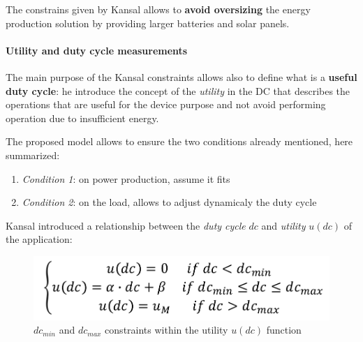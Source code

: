 \documentclass[10pt,a4paper]{report}
\theoremstyle{definition}
\begin{document}
The constrains given by Kansal allows to \textbf{avoid oversizing} the energy production solution by providing larger batteries and solar panels.
\paragraph{Utility and duty cycle measurements}\label{sec:utility-and-duty-cycle-measurements}
The main purpose of the Kansal constraints allows also to define what is a \textbf{useful duty cycle}: he introduce the concept of the \textit{utility} in the DC that describes the operations that are useful for the device purpose and not avoid performing operation due to insufficient energy.

The proposed model allows to ensure the two conditions already mentioned, here summarized:
\begin{enumerate}
	\item 
	\textit{Condition 1}: on power production, assume it fits
	\item 
	\textit{Condition 2}: on the load, allows to adjust dynamicaly the duty cycle
\end{enumerate}

Kansal introduced a relationship between the \textit{duty cycle} $dc$ and \textit{utility} $u(dc)$ of the application:
\begin{figure}[h]
	\centering\includegraphics[scale=0.30]{images/Pasted image 20230509154741.png}
	\caption{$dc_{min}$ and $dc_{max}$ constraints within the utility $u(dc)$ function}

\end{figure}
\end{document}
